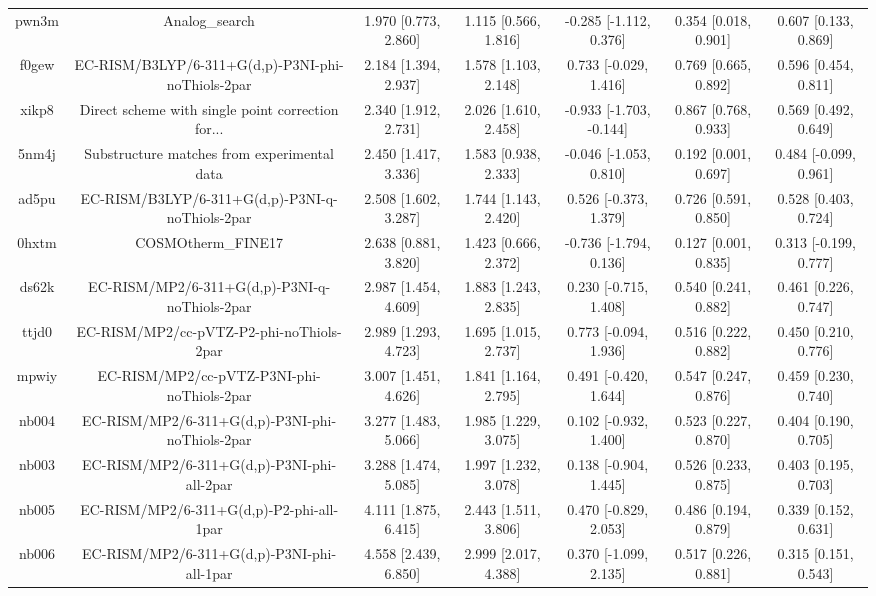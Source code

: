 \documentclass{article}
\begin{document}
\begin{center}
\begin{longtable}{|ccccccc|}
 pwn3m &                                     Analog\_search &  1.970 [0.773, 2.860] &  1.115 [0.566, 1.816] &   -0.285 [-1.112, 0.376] &  0.354 [0.018, 0.901] &   0.607 [0.133, 0.869] \\
 f0gew &  EC-RISM/B3LYP/6-311+G(d,p)-P3NI-phi-noThiols-2par &  2.184 [1.394, 2.937] &  1.578 [1.103, 2.148] &    0.733 [-0.029, 1.416] &  0.769 [0.665, 0.892] &   0.596 [0.454, 0.811] \\
 xikp8 &  Direct scheme with single point correction for... &  2.340 [1.912, 2.731] &  2.026 [1.610, 2.458] &  -0.933 [-1.703, -0.144] &  0.867 [0.768, 0.933] &   0.569 [0.492, 0.649] \\
 5nm4j &        Substructure matches from experimental data &  2.450 [1.417, 3.336] &  1.583 [0.938, 2.333] &   -0.046 [-1.053, 0.810] &  0.192 [0.001, 0.697] &  0.484 [-0.099, 0.961] \\
 ad5pu &    EC-RISM/B3LYP/6-311+G(d,p)-P3NI-q-noThiols-2par &  2.508 [1.602, 3.287] &  1.744 [1.143, 2.420] &    0.526 [-0.373, 1.379] &  0.726 [0.591, 0.850] &   0.528 [0.403, 0.724] \\
 0hxtm &                                 COSMOtherm\_FINE17 &  2.638 [0.881, 3.820] &  1.423 [0.666, 2.372] &   -0.736 [-1.794, 0.136] &  0.127 [0.001, 0.835] &  0.313 [-0.199, 0.777] \\
 ds62k &      EC-RISM/MP2/6-311+G(d,p)-P3NI-q-noThiols-2par &  2.987 [1.454, 4.609] &  1.883 [1.243, 2.835] &    0.230 [-0.715, 1.408] &  0.540 [0.241, 0.882] &   0.461 [0.226, 0.747] \\
 ttjd0 &           EC-RISM/MP2/cc-pVTZ-P2-phi-noThiols-2par &  2.989 [1.293, 4.723] &  1.695 [1.015, 2.737] &    0.773 [-0.094, 1.936] &  0.516 [0.222, 0.882] &   0.450 [0.210, 0.776] \\
 mpwiy &         EC-RISM/MP2/cc-pVTZ-P3NI-phi-noThiols-2par &  3.007 [1.451, 4.626] &  1.841 [1.164, 2.795] &    0.491 [-0.420, 1.644] &  0.547 [0.247, 0.876] &   0.459 [0.230, 0.740] \\
 nb004 &    EC-RISM/MP2/6-311+G(d,p)-P3NI-phi-noThiols-2par &  3.277 [1.483, 5.066] &  1.985 [1.229, 3.075] &    0.102 [-0.932, 1.400] &  0.523 [0.227, 0.870] &   0.404 [0.190, 0.705] \\
 nb003 &         EC-RISM/MP2/6-311+G(d,p)-P3NI-phi-all-2par &  3.288 [1.474, 5.085] &  1.997 [1.232, 3.078] &    0.138 [-0.904, 1.445] &  0.526 [0.233, 0.875] &   0.403 [0.195, 0.703] \\
 nb005 &           EC-RISM/MP2/6-311+G(d,p)-P2-phi-all-1par &  4.111 [1.875, 6.415] &  2.443 [1.511, 3.806] &    0.470 [-0.829, 2.053] &  0.486 [0.194, 0.879] &   0.339 [0.152, 0.631] \\
 nb006 &         EC-RISM/MP2/6-311+G(d,p)-P3NI-phi-all-1par &  4.558 [2.439, 6.850] &  2.999 [2.017, 4.388] &    0.370 [-1.099, 2.135] &  0.517 [0.226, 0.881] &   0.315 [0.151, 0.543] \\
\end{longtable}
\end{center}
\end{document}
